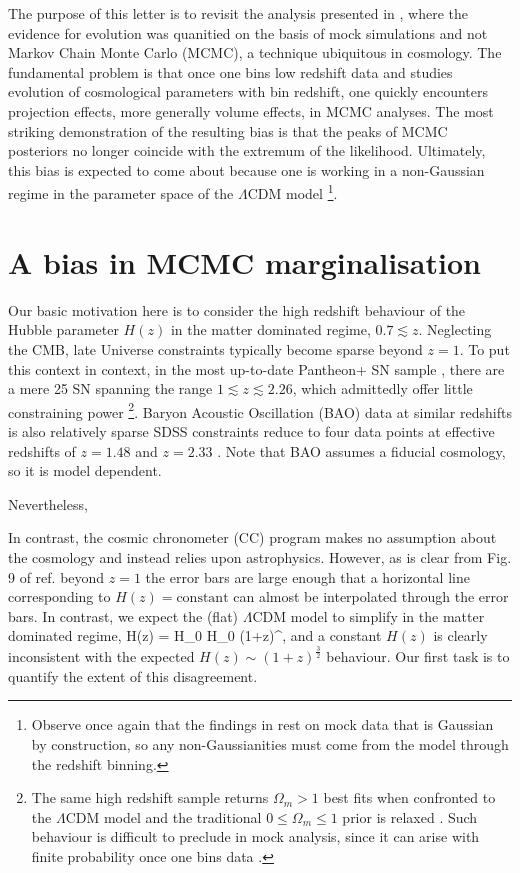 \documentclass[a4paper,11pt]{article}
\begin{document}
 The purpose of this letter is to revisit the analysis presented in \cite{}, where the evidence for evolution was quanitied on the basis of mock simulations and not Markov Chain Monte Carlo (MCMC), a technique ubiquitous in cosmology. The fundamental problem is that once one bins low redshift data and studies evolution of cosmological parameters with bin redshift, one quickly encounters projection effects, more generally volume effects, in MCMC analyses. The most striking demonstration of the resulting bias is that the peaks of MCMC posteriors no longer coincide with the extremum of the likelihood. Ultimately, this bias is expected to come about because one is working in a non-Gaussian regime in the parameter space of the $\Lambda$CDM model \cite{} \footnote{Observe once again that the findings in \cite{} rest on mock data that is Gaussian by construction, so any non-Gaussianities must come from the model through the redshift binning.}.   

\section{A bias in MCMC marginalisation}
Our basic motivation here is to consider the high redshift behaviour of the Hubble parameter $H(z)$ in the matter dominated regime, $0.7 \lesssim z$. Neglecting the CMB, late Universe constraints typically become sparse beyond $z = 1$. To put this context in context, in the most up-to-date Pantheon+ SN sample \cite{Scolnic:2021amr, Brout:2022vxf}, there are a mere 25 SN spanning the range $1 \lesssim z \lesssim 2.26$, which admittedly offer little constraining power \footnote{The same high redshift sample returns $\Omega_m > 1$ best fits when confronted to the $\Lambda$CDM model and the traditional $0 \leq \Omega_m \leq 1$ prior is relaxed \cite{Malekjani:2023dky}. Such behaviour is difficult to preclude in mock analysis, since it can arise with finite probability once one bins data \cite{Colgain:2022tql}.}. Baryon Acoustic Oscillation (BAO) data at similar redshifts is also relatively sparse SDSS constraints reduce to four data points at effective redshifts of $z = 1.48$ \cite{Hou:2020rse, Neveux:2020voa} and $z = 2.33$  \cite{duMasdesBourboux:2020pck}. Note that BAO assumes a fiducial cosmology, so it is model dependent. 

Nevertheless, 

In contrast, the cosmic chronometer (CC) program \cite{Jimenez:2001gg} makes no assumption about the cosmology and instead relies upon astrophysics. However, as is clear from Fig. 9 of ref.  \cite{Tomasetti:2023kek} beyond $z=1$ the error bars are large enough that a horizontal line corresponding to $H(z) = \textrm{constant}$ can almost be interpolated through the error bars. In contrast, we expect the (flat) $\Lambda$CDM model to simplify in the matter dominated regime, 
\be
H(z) = H_0  \xrightarrow[z \gg 0]{} H_0  (1+z)^{}, 
\ee
and a constant $H(z)$ is clearly inconsistent with the expected $H(z) \sim (1+z)^{\frac{3}{2}}$ behaviour. Our first task is to quantify the extent of this disagreement. 
\end{document}
